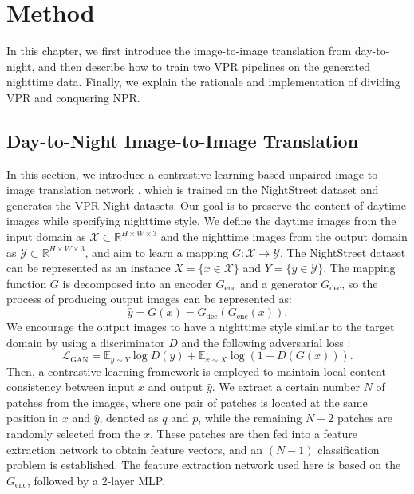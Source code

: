 \documentclass[10pt,twocolumn,letterpaper]{article}
\begin{document}
\section{Method}




In this chapter, we first introduce the image-to-image translation from day-to-night, and then describe how to train two VPR pipelines on the generated nighttime data. Finally, we explain the rationale and implementation of dividing VPR and conquering NPR.

\subsection{Day-to-Night Image-to-Image Translation}

In this section, we introduce a contrastive learning-based unpaired image-to-image translation network \cite{cut, negcut}, which is trained on the NightStreet dataset and generates the VPR-Night datasets. Our goal is to preserve the content of daytime images while specifying nighttime style. We define the daytime images from the input domain as $\mathcal{X} \subset \mathbb{R}^{H \times W \times 3}$ and the nighttime images from the output domain as $\mathcal{Y} \subset \mathbb{R}^{H \times W \times 3}$, and aim to learn a mapping $G: \mathcal{X} \to \mathcal{Y}$. The NightStreet dataset can be represented as an instance $X = \{x \in \mathcal{X}\}$ and $Y = \{y \in \mathcal{Y}\}$. The mapping function $G$ is decomposed into an encoder $G_{\mathrm{enc}}$ and a generator $G_{\mathrm{dec}}$, so the process of producing output images can be represented as: 
\begin{equation}
\hat{y} = G(x) = G_{\mathrm{dec}}(G_{\mathrm{enc}}(x)).
\end{equation}
We encourage the output images to have a nighttime style similar to the target domain by using a discriminator $D$ and the following adversarial loss \cite{unpaired}: 
\begin{equation}
\mathcal{L}_{\mathrm{GAN}} = \mathbb{E}_{y\sim Y}\log{D(y)} + \mathbb{E}_{x\sim X}\log{(1-D(G(x)))}.
\end{equation}
Then, a contrastive learning framework is employed to maintain local content consistency between input $x$ and output $\hat{y}$. We extract a certain number $N$ of patches from the images, where one pair of patches is located at the same position in $x$ and $\hat{y}$, denoted as $q$ and $p$, while the remaining $N-2$ patches are randomly selected from the $x$. These patches are then fed into a feature extraction network to obtain feature vectors, and an $(N-1)$ classification problem is established. The feature extraction network used here is based on the $G_{\mathrm{enc}}$, followed by a 2-layer MLP.
\end{document}
